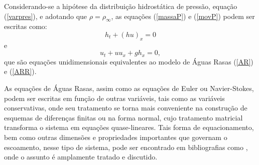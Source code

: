 Considerando-se a hipótese da distribuição hidrostática de pressão, equação (\ref{varpres}), e adotando que $\rho = \rho_\infty$, as equações (\ref{massaP}) e (\ref{movP}) podem ser escritas como:
\begin{equation} \label{ARR2}
h_t + (hu)_x = 0
\end{equation}
e
\begin{equation} \label{AR2}
u_t + uu_x + gh_x = 0,
\end{equation}
que são equações unidimensionais equivalentes ao modelo de Águas Rasas (\ref{AR}) e (\ref{ARR}).

As equações de Águas Rasas, assim como as equações de Euler ou Navier-Stokes, podem ser escritas em função de outras variáveis, tais como as variáveis conservativas, onde seu tratamento se torna mais conveniente na construção de esquemas de diferenças finitas ou na forma normal, cujo tratamento matricial transforma o sistema em equações quase-lineares. Tais forma de equacionamento, bem como outras dimensões e propriedades importantes que governam o escoamento, nesse tipo de sistema, pode ser encontrado em bibliografias como , onde o assunto é amplamente tratado e discutido.



